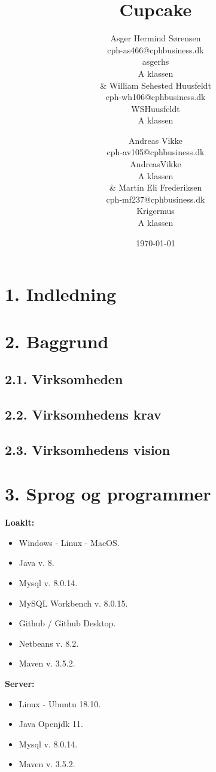 \documentclass[11pt]{report}
\title{Cupcake}
\author{
    Asger Hermind Sørensen\\
    cph-as466@cphbusiness.dk\\
    asgerhs\\
    A klassen\\
  &
    William Sehested Huusfeldt\\
    cph-wh106@cphbusiness.dk\\
    WSHuusfeldt\\
    A klassen
  \and
    Andreas Vikke\\
    cph-av105@cphbusiness.dk\\
    AndreasVikke\\
    A klassen\\
  &
    Martin Eli Frederiksen\\
    cph-mf237@cphbusiness.dk\\
    Krigermus\\
    A klassen
}
\date{\today}
\begin{document}
\maketitle

\renewcommand{\cftchapleader}{\cftdotfill{\cftdotsep}}
\tableofcontents
\newpage

\chapter*{1. Indledning}
\newpage

\chapter*{2. Baggrund}
\section*{2.1. Virksomheden}

\section*{2.2. Virksomhedens krav}

\section*{2.3. Virksomhedens vision}

\newpage

\chapter*{3. Sprog og programmer}
\textbf{Loaklt:}
\begin{itemize}
  \item Windows - Linux - MacOS.
  \item Java v. 8.
  \item Mysql v. 8.0.14.
  \item MySQL Workbench v. 8.0.15.
  \item Github / Github Desktop.
  \item Netbeans v. 8.2.
  \item Maven v. 3.5.2.
\end{itemize}
\textbf{Server:}
\begin{itemize}
  \item Linux - Ubuntu 18.10.
  \item Java Openjdk 11.
  \item Mysql v. 8.0.14.
  \item Maven v. 3.5.2.
\end{itemize}
\newpage
\end{document}
